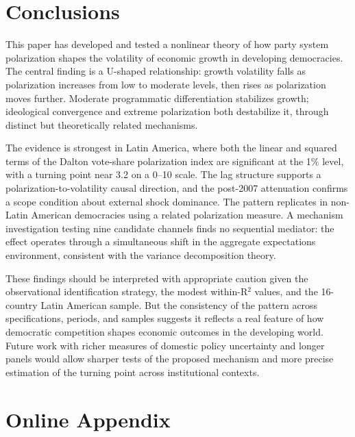 \documentclass[12pt]{article}
\begin{document}
\section{Conclusions}

This paper has developed and tested a nonlinear theory of how party system
polarization shapes the volatility of economic growth in developing
democracies. The central finding is a U-shaped relationship: growth
volatility falls as polarization increases from low to moderate levels, then
rises as polarization moves further. Moderate programmatic differentiation
stabilizes growth; ideological convergence and extreme polarization both
destabilize it, through distinct but theoretically related mechanisms.

The evidence is strongest in Latin America, where both the linear and
squared terms of the Dalton vote-share polarization index are significant at
the 1\% level, with a turning point near 3.2 on a 0--10 scale. The lag
structure supports a polarization-to-volatility causal direction, and the
post-2007 attenuation confirms a scope condition about external shock
dominance. The pattern replicates in non-Latin American democracies using
a related polarization measure. A mechanism investigation testing nine
candidate channels finds no sequential mediator: the effect operates through
a simultaneous shift in the aggregate expectations environment, consistent
with the variance decomposition theory.

These findings should be interpreted with appropriate caution given the
observational identification strategy, the modest within-R$^2$ values, and
the 16-country Latin American sample. But the consistency of the pattern
across specifications, periods, and samples suggests it reflects a real
feature of how democratic competition shapes economic outcomes in the
developing world. Future work with richer measures of domestic policy
uncertainty and longer panels would allow sharper tests of the proposed
mechanism and more precise estimation of the turning point across
institutional contexts.

\newpage



\newpage
\appendix
\setcounter{figure}{0}
\renewcommand{\thefigure}{A\arabic{figure}}
\section*{Online Appendix}
\end{document}
